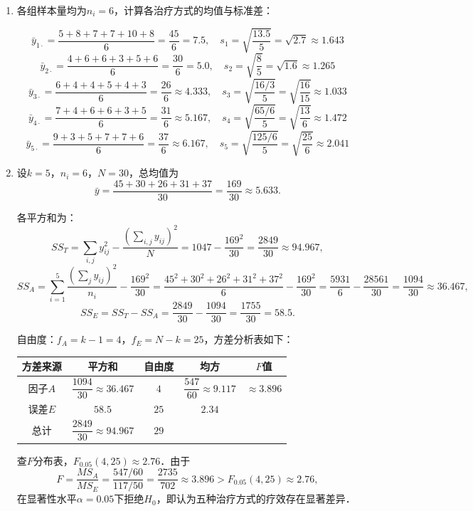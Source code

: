 \begin{solution}
\begin{enumerate}
\item 各组样本量均为$n_i = 6$，计算各治疗方式的均值与标准差：

\[
\bar{y}_{1\cdot} = \frac{5+8+7+7+10+8}{6} = \frac{45}{6} = 7.5, \quad
s_1 = \sqrt{\frac{13.5}{5}} = \sqrt{2.7} \approx 1.643
\]
\[
\bar{y}_{2\cdot} = \frac{4+6+6+3+5+6}{6} = \frac{30}{6} = 5.0, \quad
s_2 = \sqrt{\frac{8}{5}} = \sqrt{1.6} \approx 1.265
\]
\[
\bar{y}_{3\cdot} = \frac{6+4+4+5+4+3}{6} = \frac{26}{6} \approx 4.333, \quad
s_3 = \sqrt{\frac{16/3}{5}} = \sqrt{\frac{16}{15}} \approx 1.033
\]
\[
\bar{y}_{4\cdot} = \frac{7+4+6+6+3+5}{6} = \frac{31}{6} \approx 5.167, \quad
s_4 = \sqrt{\frac{65/6}{5}} = \sqrt{\frac{13}{6}} \approx 1.472
\]
\[
\bar{y}_{5\cdot} = \frac{9+3+5+7+7+6}{6} = \frac{37}{6} \approx 6.167, \quad
s_5 = \sqrt{\frac{125/6}{5}} = \sqrt{\frac{25}{6}} \approx 2.041
\]

\item 设$k=5$，$n_i = 6$，$N = 30$，总均值为
\[
\bar{y} = \frac{45+30+26+31+37}{30} = \frac{169}{30} \approx 5.633.
\]

各平方和为：
\[
SS_T = \sum_{i,j}y_{ij}^2 - \frac{(\sum_{i,j}y_{ij})^2}{N}
= 1047 - \frac{169^2}{30} = \frac{2849}{30} \approx 94.967,
\]
\[
SS_A = \sum_{i=1}^{5}\frac{\left(\sum_j y_{ij}\right)^2}{n_i} - \frac{169^2}{30}
= \frac{45^2+30^2+26^2+31^2+37^2}{6} - \frac{169^2}{30}
= \frac{5931}{6} - \frac{28561}{30} = \frac{1094}{30} \approx 36.467,
\]
\[
SS_E = SS_T - SS_A = \frac{2849}{30} - \frac{1094}{30} = \frac{1755}{30} = 58.5.
\]

自由度：$f_A = k-1 = 4$，$f_E = N-k = 25$，方差分析表如下：

\begin{table}[h]
\centering
\begin{tabular}{ccccc}
\hline
方差来源 & 平方和 & 自由度 & 均方 & $F$值 \\
\hline
因子$A$ & $\dfrac{1094}{30} \approx 36.467$ & $4$ & $\dfrac{547}{60} \approx 9.117$ & $\approx 3.896$ \\[6pt]
误差$E$ & $58.5$ & $25$ & $2.34$ & \\[2pt]
总计 & $\dfrac{2849}{30} \approx 94.967$ & $29$ & & \\
\hline
\end{tabular}
\end{table}

查$F$分布表，$F_{0.05}(4,25) \approx 2.76$．由于
\[
F = \frac{MS_A}{MS_E} = \frac{547/60}{117/50} = \frac{2735}{702} \approx 3.896 > F_{0.05}(4,25) \approx 2.76,
\]
在显著性水平$\alpha = 0.05$下拒绝$H_0$，即认为五种治疗方式的疗效存在显著差异．
\end{enumerate}
\end{solution}
